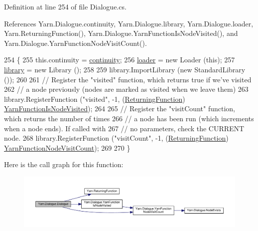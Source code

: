 Definition at line 254 of file Dialogue.\-cs.



References Yarn.\-Dialogue.\-continuity, Yarn.\-Dialogue.\-library, Yarn.\-Dialogue.\-loader, Yarn.\-Returning\-Function(), Yarn.\-Dialogue.\-Yarn\-Function\-Is\-Node\-Visited(), and Yarn.\-Dialogue.\-Yarn\-Function\-Node\-Visit\-Count().


\begin{DoxyCode}
254                                                          \{
255             this.continuity = \hyperlink{a00092_ae94eaa4b03b432422f5d205fabe37ff5}{continuity};
256             \hyperlink{a00092_a98bbe0ac2ccadeeeb7e05e3e6e19f2e0}{loader} = \textcolor{keyword}{new} Loader (\textcolor{keyword}{this});
257             \hyperlink{a00092_ae660d4cfb6e296358d2f61d8ee74c66a}{library} = \textcolor{keyword}{new} Library ();
258 
259             library.ImportLibrary (\textcolor{keyword}{new} StandardLibrary ());
260 
261             \textcolor{comment}{// Register the "visited" function, which returns true if we've visited}
262             \textcolor{comment}{// a node previously (nodes are marked as visited when we leave them)}
263             library.RegisterFunction (\textcolor{stringliteral}{"visited"}, -1, (\hyperlink{a00051_a5177bf74fbfe7303fac9d8236c2e514b}{ReturningFunction})
      \hyperlink{a00092_a1ab129bd84381928531d503304ca08d6}{YarnFunctionIsNodeVisited});
264 
265             \textcolor{comment}{// Register the "visitCount" function, which returns the number of times}
266             \textcolor{comment}{// a node has been run (which increments when a node ends). If called with}
267             \textcolor{comment}{// no parameters, check the CURRENT node.}
268             library.RegisterFunction (\textcolor{stringliteral}{"visitCount"}, -1, (\hyperlink{a00051_a5177bf74fbfe7303fac9d8236c2e514b}{ReturningFunction})
      \hyperlink{a00092_a10c9f22d3f55e74f091cd6069c431094}{YarnFunctionNodeVisitCount});
269 
270         \}
\end{DoxyCode}


Here is the call graph for this function\-:
\nopagebreak
\begin{figure}[H]
\begin{center}
\leavevmode
\includegraphics[width=350pt]{a00092_a349debf4c4b8d48e3d80ff31ad380b0e_cgraph}
\end{center}
\end{figure}




